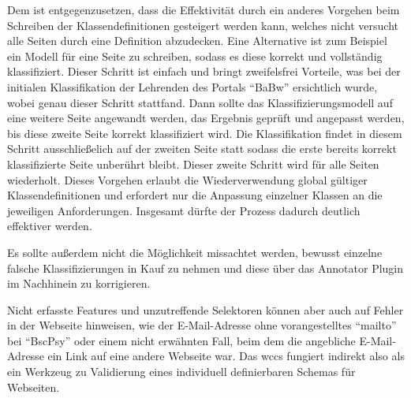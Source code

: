     Dem ist entgegenzusetzen, dass die Effektivität durch ein anderes Vorgehen beim
    Schreiben der Klassendefinitionen gesteigert werden kann,
    welches nicht versucht alle Seiten durch eine Definition abzudecken.
    Eine Alternative ist zum Beispiel ein Modell für eine Seite zu schreiben,
    sodass es diese korrekt und vollständig klassifiziert.
    Dieser Schritt ist einfach und bringt zweifelsfrei Vorteile,
    was bei der initialen Klassifikation der Lehrenden des Portals "`BaBw"' ersichtlich wurde,
    wobei genau dieser Schritt stattfand.
    Dann sollte das Klassifizierungsmodell auf eine weitere Seite angewandt werden,
    das Ergebnis geprüft und angepasst werden,
    bis diese zweite Seite korrekt klassifiziert wird.
    Die Klassifikation findet in diesem Schritt ausschließelich auf der zweiten Seite statt
    sodass die erste bereits korrekt klassifizierte Seite unberührt bleibt.
    Dieser zweite Schritt wird für alle Seiten wiederholt.
    Dieses Vorgehen erlaubt die Wiederverwendung global gültiger Klassendefinitionen
    und erfordert nur die Anpassung einzelner Klassen an die jeweiligen Anforderungen.
    Insgesamt dürfte der Prozess dadurch deutlich effektiver werden.

    Es sollte außerdem nicht die Möglichkeit missachtet werden,
    bewusst einzelne falsche Klassifizierungen in Kauf zu nehmen
    und diese über das Annotator Plugin im Nachhinein zu korrigieren.

    Nicht erfasste Features und unzutreffende Selektoren können
    aber auch auf Fehler in der Webseite hinweisen,
    wie der E-Mail-Adresse ohne vorangestelltes "`mailto"'
    bei "`BscPsy"' oder einem nicht erwähnten Fall,
    beim dem die angebliche E-Mail-Adresse ein Link auf eine andere Webseite war.
    Das \gls{wccs} fungiert indirekt also als ein Werkzeug
    zu Validierung eines individuell definierbaren Schemas für Webseiten.